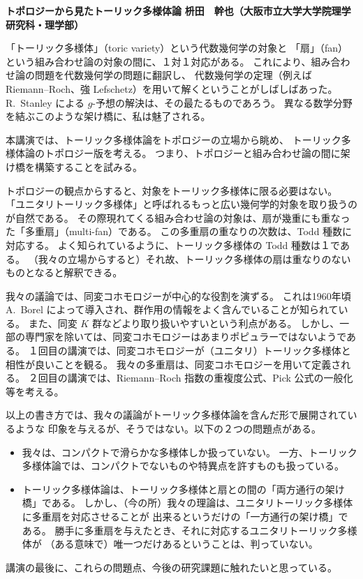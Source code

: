 \documentclass[uplatex,dvipdfmx]{jlreq}
\begin{document}
\newpage

\noindent
{\large\bfseries トポロジーから見たトーリック多様体論}
\hfill
{\large\bfseries 枡田　幹也（大阪市立大学大学院理学研究科・理学部）}

\bigskip

「トーリック多様体」（toric variety）という代数幾何学の対象と
「扇」（fan）という組み合わせ論の対象の間に、１対１対応がある。
これにより、組み合わせ論の問題を代数幾何学の問題に翻訳し、
代数幾何学の定理（例えば Riemann--Roch、強 Lefschetz）を用いて解くということがしばしばあった。
R.~Stanley による $g$-予想の解決は、その最たるものであろう。
異なる数学分野を結ぶこのような架け橋に、私は魅了される。

本講演では、トーリック多様体論をトポロジーの立場から眺め、
トーリック多様体論のトポロジー版を考える。
つまり、トポロジーと組み合わせ論の間に架け橋を構築することを試みる。

トポロジーの観点からすると、対象をトーリック多様体に限る必要はない。
「ユニタリトーリック多様体」と呼ばれるもっと広い幾何学的対象を取り扱うのが自然である。
その際現れてくる組み合わせ論の対象は、扇が幾重にも重なった「多重扇」（multi-fan）である。
この多重扇の重なりの次数は、Todd 種数に対応する。
よく知られているように、トーリック多様体の Todd 種数は１である。
（我々の立場からすると）それ故、トーリック多様体の扇は重なりのないものとなると解釈できる。

我々の議論では、同変コホモロジーが中心的な役割を演ずる。
これは1960年頃 A.~Borel によって導入され、群作用の情報をよく含んでいることが知られている。
また、同変 $K$ 群などより取り扱いやすいという利点がある。
しかし、一部の専門家を除いては、同変コホモロジーはあまりポピュラーではないようである。
１回目の講演では、同変コホモロジーが（ユニタリ）トーリック多様体と相性が良いことを観る。
我々の多重扇は、同変コホモロジーを用いて定義される。
２回目の講演では、Riemann--Roch 指数の重複度公式、Pick 公式の一般化等を考える。

以上の書き方では、我々の議論がトーリック多様体論を含んだ形で展開されているような
印象を与えるが、そうではない。以下の２つの問題点がある。
\begin{itemize}
  \item 我々は、コンパクトで滑らかな多様体しか扱っていない。
        一方、トーリック多様体論では、コンパクトでないものや特異点を許すものも扱っている。
  \item トーリック多様体論は、トーリック多様体と扇との間の「両方通行の架け橋」である。
        しかし、（今の所）我々の理論は、ユニタリトーリック多様体に多重扇を対応させることが
        出来るというだけの「一方通行の架け橋」である。
        勝手に多重扇を与えたとき、それに対応するユニタリトーリック多様体が
        （ある意味で）唯一つだけあるということは、判っていない。
\end{itemize}
講演の最後に、これらの問題点、今後の研究課題に触れたいと思っている。
\end{document}
